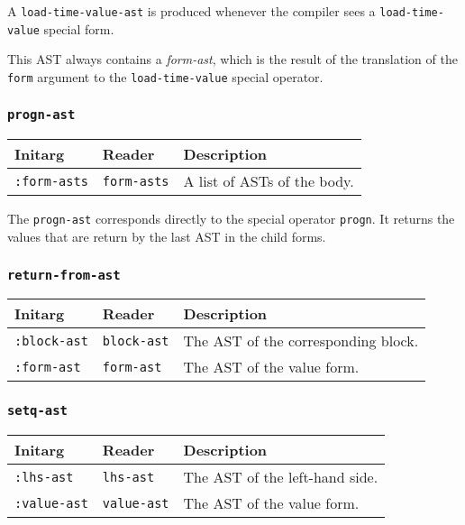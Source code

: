 A \texttt{load-time-value-ast} is produced whenever the compiler sees
a \texttt{load-time-value} special form.

This AST always contains a \emph{form-ast}, which is the result of the
translation of the \texttt{form} argument to the
\texttt{load-time-value} special operator.

\subsubsection{\texttt{progn-ast}}
\label{progn-ast}

\begin{tabular}{|l|l|l|}
\hline
Initarg & Reader & Description\\
\hline\hline
\texttt{:form-asts} & \texttt{form-asts} & A list of ASTs of the body.\\
\hline
\end{tabular}

The \texttt{progn-ast} corresponds directly to the \commonlisp{} special
operator \texttt{progn}.  It returns the values that are return by the
last AST in the child forms.

\subsubsection{\texttt{return-from-ast}}
\label{return-from-ast}

\begin{tabular}{|l|l|l|}
\hline
Initarg & Reader & Description\\
\hline\hline
\texttt{:block-ast} & \texttt{block-ast} & The AST of the
corresponding block.\\
\hline
\texttt{:form-ast} & \texttt{form-ast} & The AST of the value form.\\
\hline
\end{tabular}

\subsubsection{\texttt{setq-ast}}
\label{setq-ast}

\begin{tabular}{|l|l|l|}
\hline
Initarg & Reader & Description\\
\hline\hline
\texttt{:lhs-ast} & \texttt{lhs-ast} & The AST of the left-hand side.\\
\hline
\texttt{:value-ast} & \texttt{value-ast} & The AST of the value form.\\
\hline
\end{tabular}


